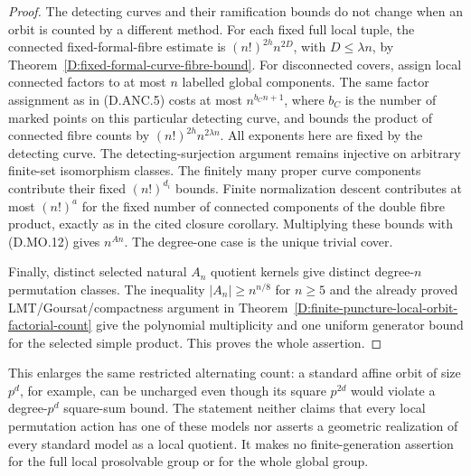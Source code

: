 \begin{proof}
The detecting curves and their ramification bounds do
not change when an orbit is counted by a different
method. For each fixed full local tuple, the connected
fixed-formal-fibre estimate is
$(n!)^{2h}n^{2D}$, with $D\le\lambda n$, by
Theorem~\ref{D:fixed-formal-curve-fibre-bound}.
For disconnected covers, assign local connected
factors to at most $n$ labelled global components.
The same factor assignment as in (D.ANC.5) costs at
most $n^{b_C n+1}$, where $b_C$ is the number of marked
points on this particular detecting curve, and bounds the
product of connected
fibre counts by $(n!)^{2h}n^{2\lambda n}$.
All exponents here are fixed by the detecting curve.
The detecting-surjection argument remains injective
on arbitrary finite-set isomorphism classes.
The finitely many proper curve components contribute
their fixed $(n!)^{d_i}$ bounds. Finite normalization
descent contributes at most $(n!)^a$ for the fixed
number of connected components of the double fibre
product, exactly as in the cited closure corollary.
Multiplying these bounds with (D.MO.12) gives $n^{An}$.
The degree-one case is the unique trivial cover.

Finally, distinct selected natural $A_n$ quotient
kernels give distinct degree-$n$ permutation classes.
The inequality $|A_n|\ge n^{n/8}$ for $n\ge5$
and the already proved LMT/Goursat/compactness
argument in
Theorem~\ref{D:finite-puncture-local-orbit-factorial-count}
give the polynomial multiplicity and one uniform
generator bound for the selected simple product.
This proves the whole assertion.
\end{proof}

\begin{remark}
This enlarges the same restricted alternating count:
a standard affine orbit of size $p^d$, for example,
can be uncharged even though its square $p^{2d}$
would violate a degree-$p^d$ square-sum bound.
The statement neither claims that every local
permutation action has one of these models nor
asserts a geometric realization of every standard
model as a local quotient. It makes no
finite-generation assertion for the full local
prosolvable group or for the whole global group.
\end{remark}
